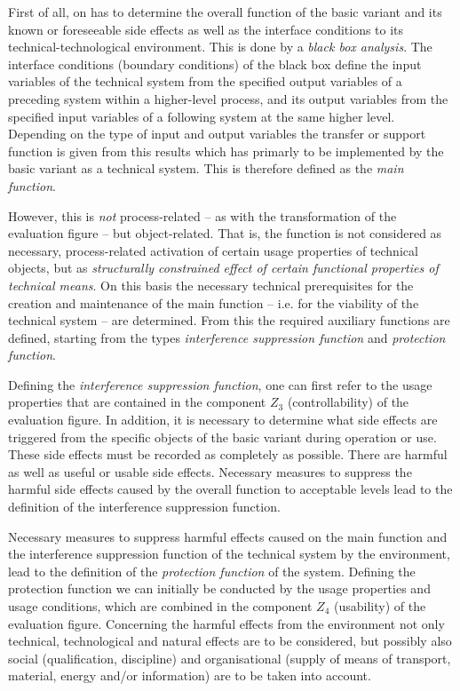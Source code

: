 \documentclass[11pt,a4paper]{article}
\begin{document}
First of all, on has to determine the overall function of the basic variant
and its known or foreseeable side effects as well as the interface conditions
to its technical-technological environment. This is done by a \emph{black box
  analysis}.  The interface conditions (boundary conditions) of the black box
define the input variables of the technical system from the specified output
variables of a preceding system within a higher-level process, and its output
variables from the specified input variables of a following system at the same
higher level. Depending on the type of input and output variables the transfer
or support function is given from this results which has primarly to be
implemented by the basic variant as a technical system. This is therefore
defined as the \emph{main function}.

However, this is \emph{not} process-related -- as with the transformation of
the evaluation figure -- but object-related.  That is, the function is not
considered as necessary, process-related activation of certain usage
properties of technical objects, but as \emph{structurally constrained effect
  of certain functional properties of technical means}. On this basis the
necessary technical prerequisites for the creation and maintenance of the main
function -- i.e. for the viability of the technical system -- are determined.
From this the required auxiliary functions are defined, starting from the
types \emph{interference suppression function} and \emph{protection function}.

Defining the \emph{interference suppression function}, one can first refer to
the usage properties that are contained in the component $Z_3$
(controllability) of the evaluation figure.  In addition, it is necessary to
determine what side effects are triggered from the specific objects of the
basic variant during operation or use. These side effects must be recorded as
completely as possible.  There are harmful as well as useful or usable side
effects.  Necessary measures to suppress the harmful side effects caused by
the overall function to acceptable levels lead to the definition of the
interference suppression function.

Necessary measures to suppress harmful effects caused on the main function and
the interference suppression function of the technical system by the
environment, lead to the definition of the \emph{protection function} of the
system. Defining the protection function we can initially be conducted by the
usage properties and usage conditions, which are combined in the component
$Z_4$ (usability) of the evaluation figure. Concerning the harmful effects
from the environment not only technical, technological and natural effects are
to be considered, but possibly also social (qualification, discipline) and
organisational (supply of means of transport, material, energy and/or
information) are to be taken into account.
\end{document}
